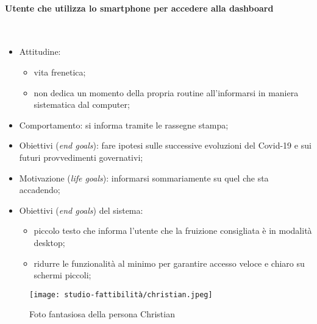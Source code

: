 \paragraph{Utente che utilizza lo smartphone per accedere alla dashboard}\mbox{}\\
\vspace{-5mm}
\begin{itemize}
	\item Attitudine:
    \begin{itemize}
        \item vita frenetica;
        \item non dedica un momento della propria routine all'informarsi in maniera sistematica dal computer;
    \end{itemize}
    \item Comportamento: si informa tramite le rassegne stampa;
    \item Obiettivi (\textit{end goals}): fare ipotesi sulle successive evoluzioni del Covid-19 e sui futuri provvedimenti governativi;
    \item Motivazione (\textit{life goals}): informarsi sommariamente su quel che sta accadendo;
    \item Obiettivi (\textit{end goals}) del sistema:
    \begin{itemize}
        \item piccolo testo che informa l'utente che la fruizione consigliata è in modalità desktop;
        \item ridurre le funzionalità al minimo per garantire accesso veloce e chiaro su schermi piccoli;
    \end{itemize}
\end{itemize}

\begin{wrapfigure}{l}{7cm}
    \texttt{[image: studio-fattibilità/christian.jpeg]}
    \caption{Foto fantasiosa della persona Christian}
\end{wrapfigure}

